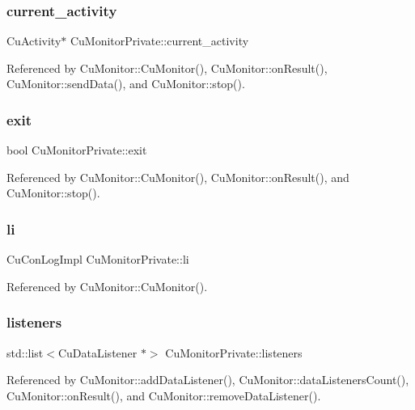 \subsubsection{current\+\_\+activity}
{\footnotesize\ttfamily Cu\+Activity$\ast$ Cu\+Monitor\+Private\+::current\+\_\+activity}



Referenced by Cu\+Monitor\+::\+Cu\+Monitor(), Cu\+Monitor\+::on\+Result(), Cu\+Monitor\+::send\+Data(), and Cu\+Monitor\+::stop().

\mbox{\label{classCuMonitorPrivate_a6af7851eb453387b319956e83010b579}} 
\subsubsection{exit}
{\footnotesize\ttfamily bool Cu\+Monitor\+Private\+::exit}



Referenced by Cu\+Monitor\+::\+Cu\+Monitor(), Cu\+Monitor\+::on\+Result(), and Cu\+Monitor\+::stop().

\mbox{\label{classCuMonitorPrivate_aeeddf8d712a455f074ff49819c62589f}} 
\subsubsection{li}
{\footnotesize\ttfamily Cu\+Con\+Log\+Impl Cu\+Monitor\+Private\+::li}



Referenced by Cu\+Monitor\+::\+Cu\+Monitor().

\mbox{\label{classCuMonitorPrivate_abb87f9db3a9dea818e42dfa9fe4c4462}} 
\subsubsection{listeners}
{\footnotesize\ttfamily std\+::list$<$Cu\+Data\+Listener $\ast$$>$ Cu\+Monitor\+Private\+::listeners}



Referenced by Cu\+Monitor\+::add\+Data\+Listener(), Cu\+Monitor\+::data\+Listeners\+Count(), Cu\+Monitor\+::on\+Result(), and Cu\+Monitor\+::remove\+Data\+Listener().


